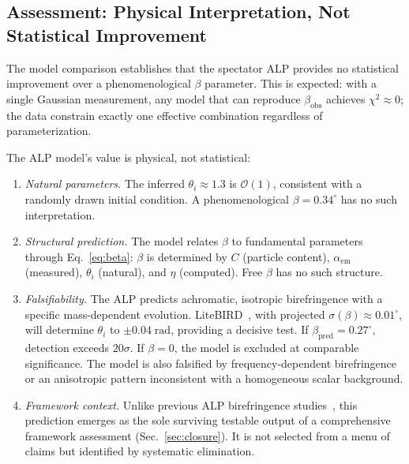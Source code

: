 \subsection{Assessment: Physical Interpretation, Not Statistical Improvement}
\label{sec:honest_assessment}

The model comparison establishes that the spectator ALP provides no
statistical improvement over a phenomenological $\beta$ parameter.  This is
expected: with a single Gaussian measurement, any model that can reproduce
$\beta_\mathrm{obs}$ achieves $\chi^2 \approx 0$; the data constrain exactly
one effective combination regardless of parameterization.

The ALP model's value is physical, not statistical:

\begin{enumerate}
\item \emph{Natural parameters.}  The inferred $\theta_i \approx 1.3$ is
  $\mathcal{O}(1)$, consistent with a randomly drawn initial condition.  A
  phenomenological $\beta = 0.34^\circ$ has no such interpretation.

\item \emph{Structural prediction.}  The model relates $\beta$ to fundamental
  parameters through Eq.~\eqref{eq:beta}: $\beta$ is determined by $C$
  (particle content), $\alpha_\mathrm{em}$ (measured), $\theta_i$ (natural),
  and $\eta$ (computed).  Free $\beta$ has no such structure.

\item \emph{Falsifiability.}  The ALP predicts achromatic, isotropic
  birefringence with a specific mass-dependent evolution.
  LiteBIRD~\cite{LiteBIRD}, with projected $\sigma(\beta) \approx 0.01^\circ$,
  will determine $\theta_i$ to $\pm 0.04\;\mathrm{rad}$, providing a decisive
  test.  If $\beta_\mathrm{pred} = 0.27^\circ$, detection exceeds
  $20\sigma$.  If $\beta = 0$, the model is excluded at comparable
  significance.  The model is also falsified by frequency-dependent
  birefringence or an anisotropic pattern inconsistent with a homogeneous
  scalar background.

\item \emph{Framework context.}  Unlike previous ALP birefringence
  studies~\cite{Fujita2021,Nakagawa2025,LinYanagida2023}, this prediction
  emerges as the sole surviving testable output of a comprehensive
  framework assessment (Sec.~\ref{sec:closure}).  It is not selected from a
  menu of claims but identified by systematic elimination.
\end{enumerate}

